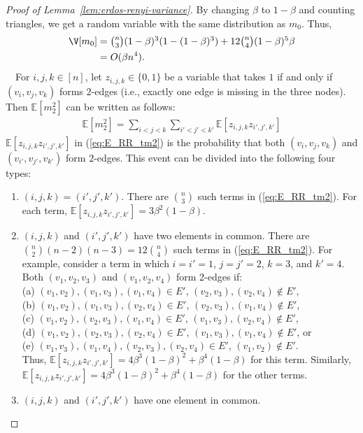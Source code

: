 \begin{proof}[Proof of Lemma~\ref{lem:erdos-renyi-variance}]
By changing $\beta$ to $1-\beta$ and counting triangles, we get a random variable with the same distribution as $m_0$. Thus,
\begin{align*}
  \V[m_0] 
  &= \textstyle{\binom{n}{3} (1-\beta)^3(1-(1-\beta)^3) + 12\binom{n}{4} (1-\beta)^5\beta}
  \\
  &= O(\beta n^4).
\end{align*}
\smallskip
{}~~For $i,j,k \in [n]$, let $z_{i,j,k} \in \{0,1\}$ be a variable that takes $1$ if and only if 
$(v_i, v_j, v_k)$ forms $2$-edges (i.e., exactly one edge is missing in the three nodes). 
Then $\mathbb{E}[m_2^2]$ can be written as follows:
\begin{align}
  \mathbb{E}[m_2^2] = \sum_{i<j<k} \sum_{i'<j'<k'}
  \mathbb{E}[z_{i,j,k} z_{i',j',k'}] 
  \label{eq:E_RR_tm2}
\end{align}
$\mathbb{E}[z_{i,j,k} z_{i',j',k'}]$ in (\ref{eq:E_RR_tm2}) is the probability that both $(v_i,v_j,v_k)$ and $(v_{i'},v_{j'},v_{k'})$ form $2$-edges. 
This event can be divided into the following four types:
\begin{enumerate}
	\item $(i,j,k)=(i',j',k')$. There are $\binom{n}{3}$ such terms in (\ref{eq:E_RR_tm2}). 
    For each term, $\mathbb{E}[z_{i,j,k} z_{i',j',k'}]=3\beta^2(1-\beta)$. 
	\item $(i,j,k)$ and $(i',j',k')$ have two elements in common. 
	There are $\binom{n}{2}(n-2)(n-3) = 12 \binom{n}{4}$ such terms in (\ref{eq:E_RR_tm2}). 
	For example, consider a term in which $i=i'=1$, $j=j'=2$, $k=3$, and $k'=4$. 
	Both $(v_1,v_2,v_3)$ and $(v_1,v_2,v_4)$ form 2-edges if:\\
	(a) $(v_1,v_2), (v_1,v_3), (v_1,v_4) \in E'$, $(v_2,v_3), (v_2,v_4) \notin E'$, \\
	(b) $(v_1,v_2), (v_1,v_3), (v_2,v_4) \in E'$, $(v_2,v_3), (v_1,v_4) \notin E'$, \\
	(c) $(v_1,v_2), (v_2,v_3), (v_1,v_4) \in E'$, $(v_1,v_3), (v_2,v_4) \notin E'$, \\
	(d) $(v_1,v_2), (v_2,v_3), (v_2,v_4) \in E'$, $(v_1,v_3), (v_1,v_4) \notin E'$, or \\
	(e) $(v_1,v_3), (v_1,v_4), (v_2,v_3), (v_2,v_4) \in E'$, $(v_1,v_2) \notin E'$. \\
    Thus, $\mathbb{E}[z_{i,j,k} z_{i',j',k'}]=4\beta^3(1-\beta)^2 + \beta^4(1-\beta)$ for this term. 
    Similarly, $\mathbb{E}[z_{i,j,k} z_{i',j',k'}]=4\beta^3(1-\beta)^2 + \beta^4(1-\beta)$ for the other terms.
	\item $(i,j,k)$ and $(i',j',k')$ have one element in common. 

\end{enumerate}
\end{proof}
